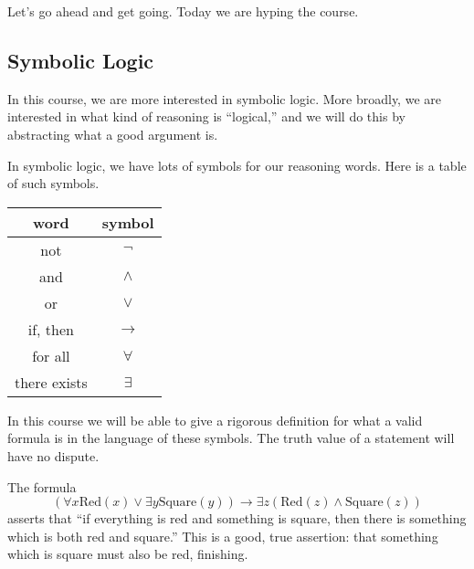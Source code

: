 





Let's go ahead and get going. Today we are hyping the course. 

\subsection{Symbolic Logic}
In this course, we are more interested in symbolic logic. More broadly, we are interested in what kind of reasoning is ``logical,'' and we will do this by abstracting what a good argument is.

In symbolic logic, we have lots of symbols for our reasoning words. Here is a table of such symbols.
\begin{center}
	\begin{tabular}{c|c}
		word & symbol \\\hline
		not & $\lnot$ \\
		and & $\land$ \\
		or & $\lor$ \\
		if, then & $\to$ \\
		for all & $\forall$ \\
		there exists & $\exists$
	\end{tabular}
\end{center}
In this course we will be able to give a rigorous definition for what a valid formula is in the language of these symbols. The truth value of a statement will have no dispute.
\begin{example}
	The formula
	\[(\forall x\text{Red}(x)\lor\exists y\text{Square}(y))\to\exists z(\text{Red}(z)\land\text{Square}(z))\]
	asserts that ``if everything is red and something is square, then there is something which is both red and square.'' This is a good, true assertion: that something which is square must also be red, finishing.
\end{example}

